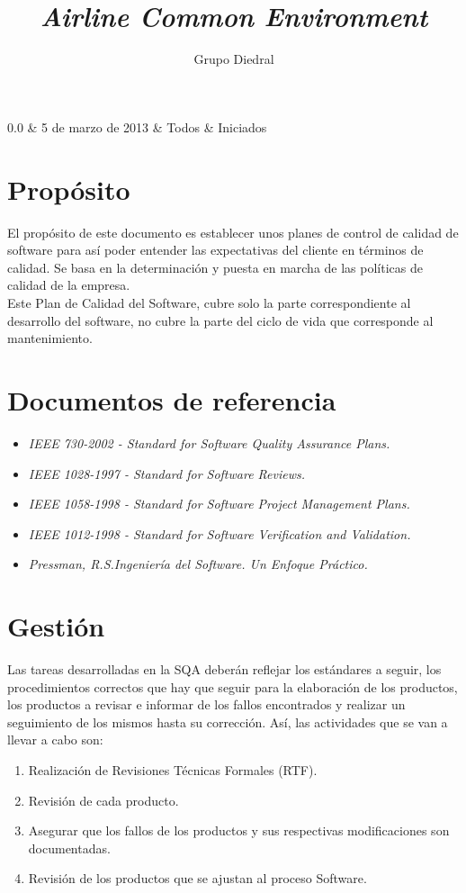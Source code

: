 \documentclass[11pt, a4paper, twoside, titlepage]{article}
\title{\doctitle\\\textsl{Airline Common Environment}}
\author{Grupo Diedral}
\newcommand*{\doctitle}{Plan de calidad}
\begin{document}
	\begin{tablacambios}
		0.0 & 5 de marzo de 2013 & Todos & Iniciados
	\end{tablacambios}


	\portadaace{\doctitle}{2.0}

	\tableofcontents
	\newpage

	\iniciarnumeraciondiedral
		
	\section{Propósito}
		El propósito de este documento es establecer unos planes de control de calidad de software para así poder entender las expectativas del cliente en términos de calidad. Se basa en la determinación y puesta en marcha de las políticas de calidad de la empresa. \\
		Este Plan de Calidad del Software, cubre solo la parte correspondiente al desarrollo del software, no cubre la parte del ciclo de vida que corresponde al mantenimiento.
		
	\section{Documentos de referencia}
		\begin{itemize}
			\item \textit{IEEE 730-2002 - Standard for Software Quality Assurance Plans.}
			\item \textit{IEEE 1028-1997 - Standard for Software Reviews.}
			\item \textit{IEEE 1058-1998 - Standard for Software Project Management Plans.}
			\item \textit{IEEE 1012-1998 - Standard for Software Verification and Validation.}
			\item \textit{Pressman, R.S.Ingeniería del Software. Un Enfoque Práctico.}
		\end{itemize}
	\section{Gestión}
		Las tareas desarrolladas en la SQA deberán reflejar los estándares a seguir, los procedimientos correctos que hay que seguir para la elaboración de los productos, los productos a revisar e informar de los fallos encontrados y realizar un seguimiento de los mismos hasta su corrección. Así, las actividades que se van a llevar a cabo son: \\
			\begin{enumerate}
				\item Realización de Revisiones Técnicas Formales (RTF).
				\item Revisión de cada producto.
				\item Asegurar que los fallos de los productos y sus respectivas modificaciones son documentadas.
				\item Revisión de los productos que se ajustan al proceso Software.
			\end{enumerate}
\end{document}
